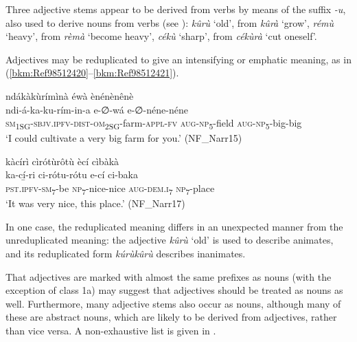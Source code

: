 Three adjective stems appear to be derived from verbs by means of the suffix \textit{-u}, also used to derive nouns from verbs (see ): \textit{kûrù} ‘old’, from \textit{kûrà} ‘grow’, \textit{rémù} ‘heavy’, from \textit{rèmà} ‘become heavy’, \textit{cékù} ‘sharp’, from \textit{cékùrà} ‘cut oneself’.

Adjectives may be reduplicated to give an intensifying or emphatic meaning, as in (\ref{bkm:Ref98512420}--\ref{bkm:Ref98512421}).

\ea
\label{bkm:Ref98512420}
ndákàkùrímìnà éwà ènénènênè\\
\gll ndi-á-ka-ku-rím-in-a e-∅-wá    e-∅-néne-néne \\
\textsc{sm}\textsubscript{1SG}-\textsc{sbjv}.\textsc{ipfv}-\textsc{dist}-\textsc{om}\textsubscript{2SG}-farm-\textsc{appl}-\textsc{fv} \textsc{aug}-\textsc{np}\textsubscript{5}-field  \textsc{aug}-\textsc{np}\textsubscript{5}-big-big\\
\glt ‘I could cultivate a very big farm for you.’ (NF\_Narr15)
\z

\ea
\label{bkm:Ref98512421}
kàcírì cìrótùrôtù ècí cìbàkà\\
\gll ka-cí̲-ri    ci-rótu-rótu    e-cí    ci-baka\\
\textsc{pst}.\textsc{ipfv}-\textsc{sm}\textsubscript{7}-be  \textsc{np}\textsubscript{7}-nice-nice  \textsc{aug}-\textsc{dem}.\textsc{i}\textsubscript{7}  \textsc{np}\textsubscript{7}-place\\
\glt ‘It was very nice, this place.’ (NF\_Narr17)
\z

In one case, the reduplicated meaning differs in an unexpected manner from the unreduplicated meaning: the adjective \textit{kûrù} ‘old’ is used to describe animates, and its reduplicated form \textit{kúrùkûrù} describes inanimates.

That adjectives are marked with almost the same prefixes as nouns (with the exception of class 1a) may suggest that adjectives should be treated as nouns as well. Furthermore, many adjective stems also occur as nouns, although many of these are abstract nouns, which are likely to be derived from adjectives, rather than vice versa. A non-exhaustive list is given in .

